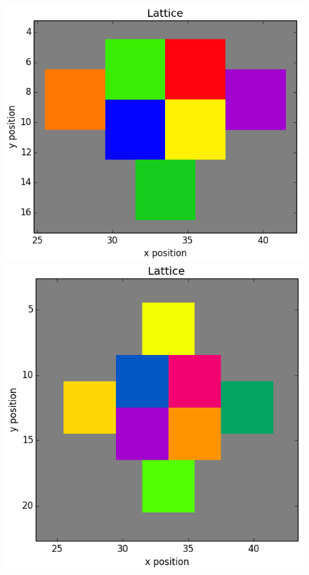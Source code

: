 \documentclass[12pt]{article}
\begin{document}
\begin{figure}[H]
	\includegraphics[scale=0.20]{img/7ctc_start}
	\includegraphics[scale=0.20]{img/8ctc_start}

\end{figure}
\end{document}
